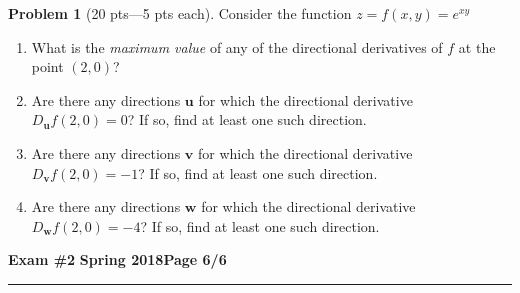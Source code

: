 \documentclass[12pt]{article}
\theoremstyle{definition}
\newtheorem{problem}{Problem}
\begin{document}
\bigskip
\begin{problem}[20 pts---5 pts each]
Consider the function $z=f(x,y)=e^{xy}$
\begin{enumerate}
  \item What is the \emph{maximum value} of any of the directional derivatives of $f$ at the point $(2,0)$?
  \vspace{2.5cm}
  \begin{flushright}
\end{flushright}
  \item Are there any directions $\boldsymbol{u}$ for which the directional derivative $D_{\boldsymbol{u}}f(2,0)=0$?  If so, find at least one such direction.
  \vspace{2.5cm}
  \begin{flushright}
\end{flushright}
  \item Are there any directions $\boldsymbol{v}$ for which the directional derivative $D_{\boldsymbol{v}}f(2,0)=-1$?  If so, find at least one such direction.
  \vspace{2.5cm}
  \begin{flushright}
\end{flushright}
  \item Are there any directions $\boldsymbol{w}$ for which the directional derivative $D_{\boldsymbol{w}}f(2,0)=-4$?  If so, find at least one such direction.
  \vspace{2.5cm}
  \begin{flushright}
\end{flushright}
\end{enumerate}
\end{problem}
\newpage

\hfill{\large\bf Exam \#2}\hfill{\large\bf
  Spring 2018}\hfill{\large\bf Page 6/6}\hrule
\end{document}
